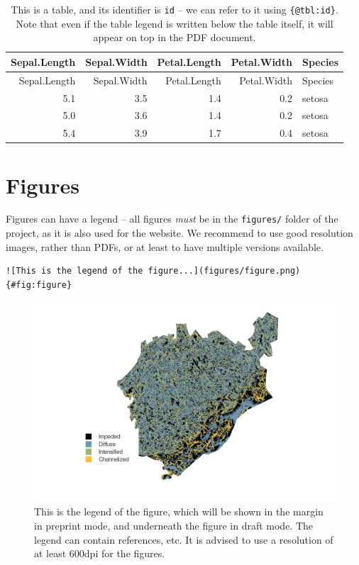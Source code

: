 \documentclass[10pt,oneside]{article}
\makeatletter
\def\maxwidth{\ifdim\Gin@nat@width>\linewidth\linewidth
\else\Gin@nat@width\fi}
\let\Oldincludegraphics\includegraphics
\renewcommand{\includegraphics}[1]{\Oldincludegraphics[width=\maxwidth]{#1}}
\makeatother
\begin{document}
\hypertarget{tbl:id}{}
\begin{longtable}[]{@{}rrrrl@{}}
\caption{\label{tbl:id}This is a table, and its identifier is
\texttt{id} -- we can refer to it using \texttt{\{@tbl:id\}}. Note that
even if the table legend is written below the table itself, it will
appear on top in the PDF document.}\tabularnewline
\toprule
Sepal.Length & Sepal.Width & Petal.Length & Petal.Width &
Species\tabularnewline
\midrule
\endfirsthead
\toprule
Sepal.Length & Sepal.Width & Petal.Length & Petal.Width &
Species\tabularnewline
\midrule
\endhead
5.1 & 3.5 & 1.4 & 0.2 & setosa\tabularnewline
5.0 & 3.6 & 1.4 & 0.2 & setosa\tabularnewline
5.4 & 3.9 & 1.7 & 0.4 & setosa\tabularnewline
\bottomrule
\end{longtable}

\hypertarget{figures}{%
\section{Figures}\label{figures}}

Figures can have a legend -- all figures \emph{must} be in the
\texttt{figures/} folder of the project, as it is also used for the
website. We recommend to use good resolution images, rather than PDFs,
or at least to have multiple versions available.

\begin{verbatim}
![This is the legend of the figure...](figures/figure.png){#fig:figure}
\end{verbatim}

\begin{figure}
\hypertarget{fig:figure}{%
\centering
\includegraphics{figures/figure.png}
\caption{This is the legend of the figure, which will be shown in the
margin in preprint mode, and underneath the figure in draft mode. The
legend can contain references, etc. It is advised to use a resolution of
at least 600dpi for the figures.}\label{fig:figure}
}
\end{figure}
\end{document}
